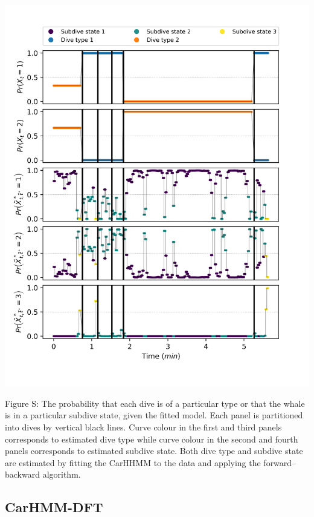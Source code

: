 \documentclass{article}
\begin{document}
        \begin{center}
        \includegraphics[width=6in]{../Plots/2019/20190902-182840-CATs_OB_1_0_267_CarHHMM1_decoded_states.png}
        \end{center}
        
        \noindent Figure S: The probability that each dive is of a particular type or that the whale is in a particular subdive state, given the fitted model. Each panel is partitioned into dives by vertical black lines. Curve colour in the first and third panels corresponds to estimated dive type while curve colour in the second and fourth panels corresponds to estimated subdive state. Both dive type and subdive state are estimated by fitting the CarHHMM to the data and applying the forward--backward algorithm.
        \addtocounter{fignum}{1}
        
        \subsection{CarHMM-DFT}
        
\end{document}
